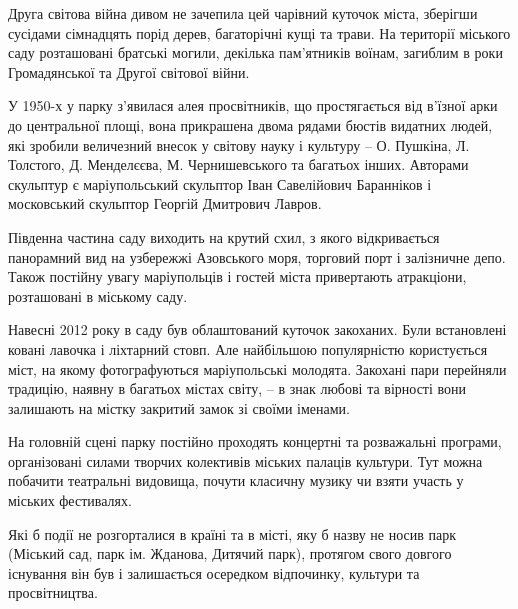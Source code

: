 
Друга світова війна дивом не зачепила цей чарівний куточок міста, зберігши
сусідами сімнадцять порід дерев, багаторічні кущі та трави. На території
міського саду розташовані братські могили, декілька пам'ятників воїнам,
загиблим в роки Громадянської та Другої світової війни.

У 1950-х у парку з'явилася алея просвітників, що простягається від в'їзної арки
до центральної площі, вона прикрашена двома рядами бюстів видатних людей, які
зробили величезний внесок у світову науку і культуру – О. Пушкіна, Л. Толстого,
Д. Менделєєва, М. Чернишевського та багатьох інших. Авторами скульптур є
маріупольський скульптор Іван Савелійович Баранніков і московський скульптор
Георгій Дмитрович Лавров.


Південна частина саду виходить на крутий схил, з якого відкривається панорамний
вид на узбережжі Азовського моря, торговий порт і залізничне депо. Також
постійну увагу маріупольців і гостей міста привертають атракціони, розташовані
в міському саду.

Навесні 2012 року в саду був облаштований куточок закоханих. Були встановлені
ковані лавочка і ліхтарний стовп. Але найбільшою популярністю користується
міст, на якому фотографуються маріупольські молодята. Закохані пари перейняли
традицію, наявну в багатьох містах світу, – в знак любові та вірності вони
залишають на містку закритий замок зі своїми іменами.

На головній сцені парку постійно проходять концертні та розважальні програми,
організовані силами творчих колективів міських палаців культури. Тут можна
побачити театральні видовища, почути класичну музику чи взяти участь у міських
фестивалях.


Які б події не розгорталися в країні та в місті, яку б назву не носив парк
(Міський сад, парк ім. Жданова, Дитячий парк), протягом свого довгого існування
він був і залишається осередком відпочинку, культури та просвітництва.

